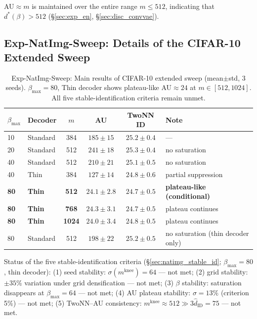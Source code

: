 \documentclass[make,article,submit,pdftex,moreauthors]{Definitions/mdpi}
\newcommand{\mknee}{m^{\mathrm{knee}}}
\begin{document}
AU$\approx m$ is maintained over the entire range $m \leq 512$, indicating that $d^*(\beta) > 512$
(\S\ref{sec:exp_en}, \S\ref{sec:disc_convvae}).

\subsection*{Exp-NatImg-Sweep: Details of the CIFAR-10 Extended Sweep}

\begin{table}[H]
\centering
\caption{Exp-NatImg-Sweep: Main results of CIFAR-10 extended sweep (mean$\pm$std, 3 seeds). $\beta_\mathrm{max}=80$, Thin decoder shows plateau-like AU$\approx24$ at $m \in [512,1024]$. All five stable-identification criteria remain unmet.}
\label{tab:natimg_sweep}
\small
\begin{tabular}{llcccl}
\toprule
$\beta_{\max}$ & Decoder & $m$ & AU & TwoNN ID & Note \\
\midrule
10 & Standard & 384 & $185\pm15$ & $25.2\pm0.4$ & --- \\
20 & Standard & 512 & $241\pm18$ & $25.3\pm0.4$ & no saturation \\
40 & Standard & 512 & $210\pm21$ & $25.1\pm0.5$ & no saturation \\
40 & Thin      & 384 & $127\pm14$ & $24.8\pm0.6$ & partial suppression \\
\textbf{80} & \textbf{Thin} & \textbf{512} & $\boldsymbol{24.1\pm2.8}$ & $24.7\pm0.5$ & \textbf{plateau-like (conditional)} \\
\textbf{80} & \textbf{Thin} & \textbf{768} & $\boldsymbol{24.3\pm3.1}$ & $24.7\pm0.5$ & plateau continues \\
\textbf{80} & \textbf{Thin} & \textbf{1024}& $\boldsymbol{24.0\pm3.4}$ & $24.8\pm0.5$ & plateau continues \\
80 & Standard  & 512 & $198\pm22$ & $25.2\pm0.5$ & no saturation (thin decoder only) \\
\bottomrule
\end{tabular}
\end{table}

Status of the five stable-identification criteria (\S\ref{sec:natimg_stable_id}; $\beta_{\max}=80$, thin decoder):
(1) seed stability: $\sigma(\mknee)=64$ --- not met;
(2) grid stability: $\pm35\%$ variation under grid densification --- not met;
(3) $\beta$ stability: saturation disappears at $\beta_{\max}=64$ --- not met;
(4) AU plateau stability: $\sigma=13\%$ (criterion 5\%) --- not met;
(5) TwoNN--AU consistency: $\mknee \approx 512 \gg 3\hat{d}_\mathrm{ID}=75$ --- not met.
\end{document}
